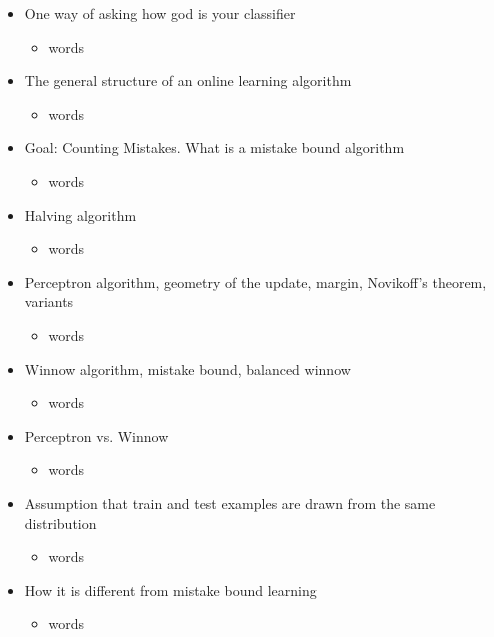 \documentclass{article}
\begin{document}
\hspace{-1.5em}{\large \bf Mistake Bound Learning}
\begin{itemize}
\item One way of asking how god is your classifier
	\begin{itemize}
	\item words
	\end{itemize}
\item The general structure of an online learning algorithm
	\begin{itemize}
	\item words
	\end{itemize}
\item Goal: Counting Mistakes. What is a mistake bound algorithm
	\begin{itemize}
	\item words
	\end{itemize}
\item Halving algorithm
	\begin{itemize}
	\item words
	\end{itemize}
\item Perceptron algorithm, geometry of the update, margin, Novikoff's theorem, variants
	\begin{itemize}
	\item words
	\end{itemize}
\item Winnow algorithm, mistake bound, balanced winnow
	\begin{itemize}
	\item words
	\end{itemize}
\item Perceptron vs. Winnow
	\begin{itemize}
	\item words
	\end{itemize}
\end{itemize}

\hspace{-1.5em}{\large \bf Batch Learning}
\begin{itemize}
\item Assumption that train and test examples are drawn from the same distribution 
	\begin{itemize}
	\item words
	\end{itemize}
\item How it is different from mistake bound learning
	\begin{itemize}
	\item words
	\end{itemize}
\end{itemize}
\end{document}
